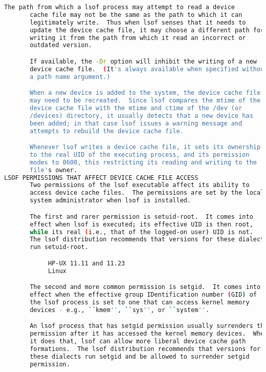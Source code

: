 {{\begin{lstlisting}[language=bash]
       The path from which a lsof process may attempt to read a device
       cache file may not be the same as the path to which it can
       legitimately write.  Thus when lsof senses that it needs to
       update the device cache file, it may choose a different path for
       writing it from the path from which it read an incorrect or
       outdated version.

       If available, the -Dr option will inhibit the writing of a new
       device cache file.  (It's always available when specified without
       a path name argument.)

       When a new device is added to the system, the device cache file
       may need to be recreated.  Since lsof compares the mtime of the
       device cache file with the mtime and ctime of the /dev (or
       /devices) directory, it usually detects that a new device has
       been added; in that case lsof issues a warning message and
       attempts to rebuild the device cache file.

       Whenever lsof writes a device cache file, it sets its ownership
       to the real UID of the executing process, and its permission
       modes to 0600, this restricting its reading and writing to the
       file's owner.
LSOF PERMISSIONS THAT AFFECT DEVICE CACHE FILE ACCESS
       Two permissions of the lsof executable affect its ability to
       access device cache files.  The permissions are set by the local
       system administrator when lsof is installed.

       The first and rarer permission is setuid-root.  It comes into
       effect when lsof is executed; its effective UID is then root,
       while its real (i.e., that of the logged-on user) UID is not.
       The lsof distribution recommends that versions for these dialects
       run setuid-root.

            HP-UX 11.11 and 11.23
            Linux

       The second and more common permission is setgid.  It comes into
       effect when the effective group IDentification number (GID) of
       the lsof process is set to one that can access kernel memory
       devices - e.g., ``kmem'', ``sys'', or ``system''.

       An lsof process that has setgid permission usually surrenders the
       permission after it has accessed the kernel memory devices.  When
       it does that, lsof can allow more liberal device cache path
       formations.  The lsof distribution recommends that versions for
       these dialects run setgid and be allowed to surrender setgid
       permission.


\end{lstlisting}}}
